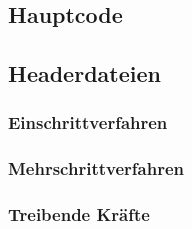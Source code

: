 \documentclass[
    oneside,
    ngerman,
    footinclude=false,
    captions=tableheading,
    DIV=12
]{scrartcl}
\begin{document}
    \aufgabe{}
        \subaufgabe{}
            
        \subaufgabe{}
            
        \subaufgabe{}
            

    \newpage
    \subsection*{Hauptcode}
        

    \subsection*{Headerdateien}
        \subsubsection*{Einschrittverfahren}
            

        \subsubsection*{Mehrschrittverfahren}
            

        \subsubsection*{Treibende Kräfte}
            
\end{document}
